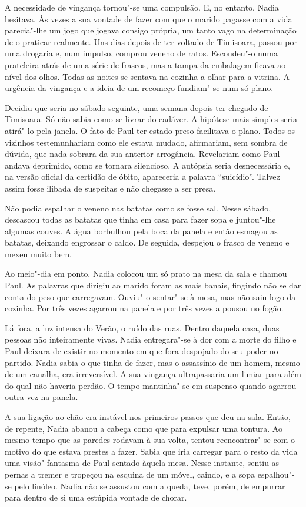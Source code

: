 A necessidade de vingança tornou"-se uma compulsão. E, no entanto, Nadia
hesitava. Às vezes a sua vontade de fazer com que o marido pagasse com a
vida parecia"-lhe um jogo que jogava consigo própria, um tanto vago na
determinação de o praticar realmente. Uns dias depois de ter voltado
de Timisoara, passou por uma drogaria e, num impulso, comprou veneno de
ratos. Escondeu"-o numa prateleira atrás de uma série de frascos, mas a
tampa da embalagem ficava ao nível dos olhos. Todas as noites se
sentava na cozinha a olhar para a vitrina. A urgência da vingança e a
ideia de um recomeço fundiam"-se num só plano.

Decidiu que seria no sábado seguinte, uma semana depois ter chegado de
Timisoara. Só não sabia como se livrar do cadáver. A hipótese mais
simples seria atirá"-lo pela janela. O fato de Paul ter estado preso
facilitava o plano. Todos os vizinhos testemunhariam como ele estava
mudado, afirmariam, sem sombra de dúvida, que nada sobrara da sua
anterior arrogância. Revelariam como Paul andava deprimido, como se
tornara silencioso. A autópsia seria desnecessária e, na versão oficial
da certidão de óbito, apareceria a palavra ``suicídio''. Talvez assim
fosse ilibada de suspeitas e não chegasse a ser presa.

Não podia espalhar o veneno nas batatas como se fosse sal. Nesse sábado,
descascou todas as batatas que tinha em casa para fazer sopa e
juntou"-lhe algumas couves. A água borbulhou pela boca da panela e então
esmagou as batatas, deixando engrossar o caldo. De seguida, despejou o
frasco de veneno e mexeu muito bem.

Ao meio"-dia em ponto, Nadia colocou um só prato na mesa da sala e chamou
Paul. As palavras que dirigiu ao
marido foram as mais banais, fingindo não se dar conta do peso que
carregavam. Ouviu"-o sentar"-se à mesa, mas não saiu logo da cozinha. Por
três vezes agarrou na panela e por três vezes a pousou no fogão.

Lá fora, a luz intensa do Verão, o ruído das ruas. Dentro daquela casa,
duas pessoas não inteiramente vivas. Nadia entregara"-se à dor com a
morte do filho e Paul deixara de existir no momento em que fora
despojado do seu poder no partido. Nadia sabia o que tinha de fazer, mas
o assassínio de um homem, mesmo de um canalha, era irreversível. A
sua vingança ultrapassaria um limiar para além do qual não haveria
perdão. O tempo mantinha"-se em suspenso quando agarrou outra vez na
panela.

A sua ligação ao chão era instável nos primeiros passos que deu na sala.
Então, de repente, Nadia abanou a cabeça como que para expulsar uma
tontura. Ao mesmo tempo que as paredes rodavam à sua volta, tentou
reencontrar"-se com o motivo do que estava prestes a fazer. Sabia que
iria carregar para o resto da vida uma visão"-fantasma de Paul sentado
àquela mesa. Nesse instante, sentiu as pernas a tremer e tropeçou na
esquina de um móvel, caindo, e a sopa espalhou"-se pelo linóleo. Nadia
não se assustou com a queda, teve, porém, de empurrar para dentro de si
uma estúpida vontade de chorar.

